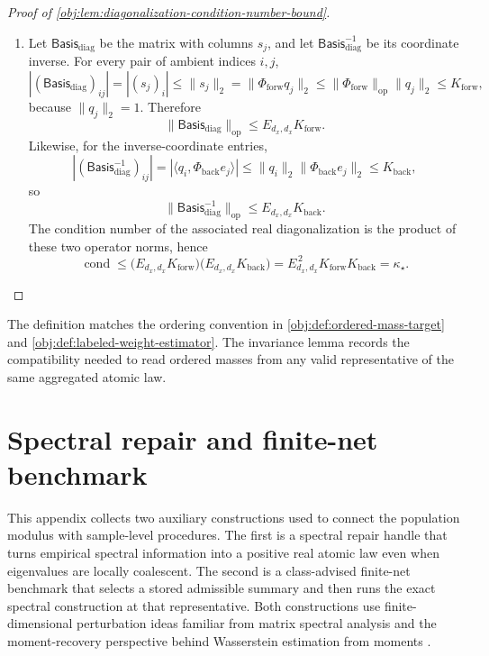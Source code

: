 \documentclass[11pt]{article}
\begin{document}
\begin{proof}[Proof of \cref{obj:lem:diagonalization-condition-number-bound}]
\begin{enumerate}
\item Let \(\mathsf{Basis}_{\mathrm{diag}}\) be the matrix with columns \(s_j\), and let \(\mathsf{Basis}_{\mathrm{diag}}^{-1}\) be its coordinate inverse. For every pair of ambient indices \(i,j\),
\[
|(\mathsf{Basis}_{\mathrm{diag}})_{ij}|
=
|(s_j)_i|
\le
\|s_j\|_2
=
\|\Phi_{\mathrm{forw}}q_j\|_2
\le
\|\Phi_{\mathrm{forw}}\|_{\mathrm{op}}\|q_j\|_2
\le
K_{\mathrm{forw}},
\]
because \(\|q_j\|_2=1\). Therefore
\[
\|\mathsf{Basis}_{\mathrm{diag}}\|_{\mathrm{op}}
\le
E_{d_x,d_x}K_{\mathrm{forw}} .
\]
Likewise, for the inverse-coordinate entries,
\[
|(\mathsf{Basis}_{\mathrm{diag}}^{-1})_{ij}|
=
|\langle q_i,\Phi_{\mathrm{back}}e_j\rangle|
\le
\|q_i\|_2\|\Phi_{\mathrm{back}}e_j\|_2
\le
K_{\mathrm{back}},
\]
so
\[
\|\mathsf{Basis}_{\mathrm{diag}}^{-1}\|_{\mathrm{op}}
\le
E_{d_x,d_x}K_{\mathrm{back}} .
\]
The condition number of the associated real diagonalization is the product of these two operator norms, hence
\[
\operatorname{cond}
\le
\bigl(E_{d_x,d_x}K_{\mathrm{forw}}\bigr)
\bigl(E_{d_x,d_x}K_{\mathrm{back}}\bigr)
=
E_{d_x,d_x}^{\,2}K_{\mathrm{forw}}K_{\mathrm{back}}
=
\kappa_\star .
\]
\end{enumerate}
\end{proof}

The definition matches the ordering convention in \cref{obj:def:ordered-mass-target} and \cref{obj:def:labeled-weight-estimator}. The invariance lemma records the compatibility needed to read ordered masses from any valid representative of the same aggregated atomic law.


\section{Spectral repair and finite-net benchmark}

This appendix collects two auxiliary constructions used to connect the population modulus with sample-level procedures. The first is a spectral repair handle that turns empirical spectral information into a positive real atomic law even when eigenvalues are locally coalescent. The second is a class-advised finite-net benchmark that selects a stored admissible summary and then runs the exact spectral construction at that representative. Both constructions use finite-dimensional perturbation ideas familiar from matrix spectral analysis \citep{BauerFike1960,Kato1995,DavisKahan1970,StewartSun1990} and the moment-recovery perspective behind Wasserstein estimation from moments \citep{WuYang2020}.
\end{document}
